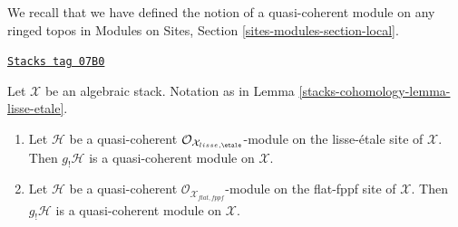 We recall that we have defined the notion of a quasi-coherent module on
any ringed topos in
Modules on Sites, Section \ref{sites-modules-section-local}.

\begin{lemma}
\label{stacks-cohomology-lemma-shriek-quasi-coherent}
\href{https://stacks.math.columbia.edu/tag/07B0}{\texttt{Stacks tag 07B0}}

Let $\mathcal{X}$ be an algebraic stack. Notation as in
Lemma \ref{stacks-cohomology-lemma-lisse-etale}.
\begin{enumerate}
\item Let $\mathcal{H}$ be a quasi-coherent
$\mathcal{O}_{\mathcal{X}_{lisse,\etale}}$-module
on the lisse-\'etale site of $\mathcal{X}$. Then $g_!\mathcal{H}$ is a
quasi-coherent module on $\mathcal{X}$.
\item Let $\mathcal{H}$ be a quasi-coherent
$\mathcal{O}_{\mathcal{X}_{flat,fppf}}$-module
on the flat-fppf site of $\mathcal{X}$. Then $g_!\mathcal{H}$ is a
quasi-coherent module on $\mathcal{X}$.
\end{enumerate}
\end{lemma}

